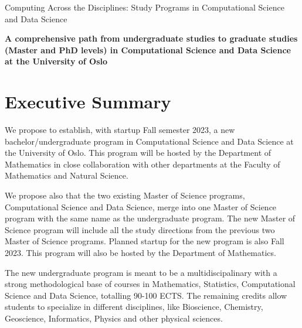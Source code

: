 \documentclass[oneside,final,10pt]{article}
\begin{document}
\thispagestyle{empty}

\begin{center}
{\LARGE\bf
\begin{spacing}{1.25}
Computing Across the Disciplines: Study Programs in Computational Science and Data Science
\end{spacing}
}
\end{center}

\begin{center}
{\bf A comprehensive path from undergraduate studies to graduate studies (Master and PhD levels) in Computational Science and Data Science at the University of Oslo }\\ [0mm]
\end{center}


\vspace{1cm}


\section*{Executive Summary}
We propose to establish, with startup Fall semester 2023, a new bachelor/undergraduate program in Computational Science and Data Science at the University of Oslo. This program will be hosted by the Department of Mathematics in close collaboration with other departments at the Faculty of Mathematics and Natural Science.

We propose also that the two existing Master of Science programs, Computational Science and Data Science, merge into one Master of Science program with the same name as the undergraduate program. The new Master of Science program will include all the study directions from the previous two Master of Science programs. Planned startup for the new program is also Fall 2023. This program will also be hosted by the Department of Mathematics.

The new undergraduate program is meant to be a multidiscipalinary with  a strong methodological base of courses in Mathematics, Statistics, Computational Science and Data Science, totalling 90-100 ECTS. The remaining credits allow students to specialize in different disciplines, like Bioscience, Chemistry, Geoscience, Informatics, Physics and other physical sciences. 
\end{document}

